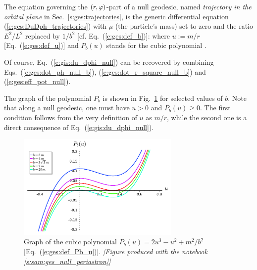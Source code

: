 The equation governing the $(r,\varphi)$-part of a null geodesic, named
\emph{trajectory in the orbital plane} in Sec.~\ref{s:ges:trajectories},
is the generic differential equation (\ref{e:ges:DuDph_trajectories})
with $\mu$ (the particle's mass) set to zero and the ratio $E^2/L^2$ replaced
by $1/b^2$ [cf. Eq.~(\ref{e:ges:def_b})]:
\be \label{e:gis:du_dphi_null}
\ee
where $u := m/r$ [Eq.~(\ref{e:ges:def_u})] and $P_b(u)$ stands for the cubic
polynomial
\be \label{e:ges:def_Pb_u}
       .
\ee
\begin{remark}
Of course, Eq.~(\ref{e:gis:du_dphi_null}) can be recovered by combining
Eqs.~(\ref{e:ges:dot_ph_null_b}), (\ref{e:ges:dot_r_square_null_b})
and (\ref{e:ges:eff_pot_null}).
\end{remark}

The graph of the polynomial $P_b$ is shown in Fig.~\ref{f:gis:polynomial_b_u}
for selected values of $b$. Note that along a null geodesic, one must
have $u>0$ and
$P_b(u) \geq 0$. The first condition follows from the very definition of
$u$ as $m/r$, while the second one is a direct consequence of
Eq.~(\ref{e:gis:du_dphi_null}).

\begin{figure}
\centerline{\includegraphics[width=0.7\textwidth]{ges_polynomial_b_u.pdf}}
\caption[]{\label{f:gis:polynomial_b_u} \footnotesize
Graph of the cubic polynomial $P_b(u) = 2 u^3 - u^2 + {m^2}/{b^2}$ [Eq.~(\ref{e:ges:def_Pb_u})].
\textsl{[Figure produced with the notebook \ref{s:sam:ges_null_periastron}]}
}
\end{figure}

